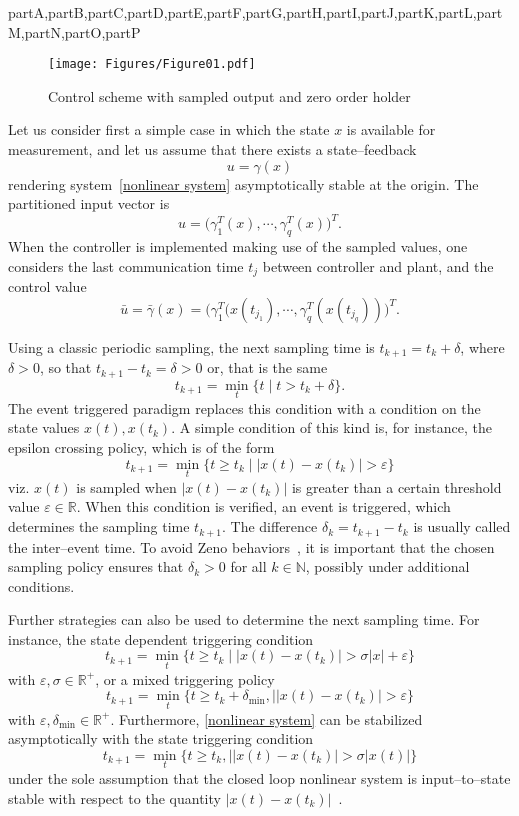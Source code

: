 \documentclass[letterpaper, 10 pt, conference]{ieeeconf}
\def\compile{partA,partB,partC,partD,partE,partF,partG,partH,partI,partJ,partK,partL,partM,partN,partO,partP}
\newcommand{\R}{\mathbb{R}}
\newcommand{\N}{\mathbb{N}}
\begin{document}
\begin{xcomment}{\compile}
\begin{partC}
\begin{figure}[h!]
\centerline{\texttt{[image: Figures/Figure01.pdf]}} 
\caption{Control scheme with sampled output and zero order holder}
\label{feedback scheme}
\end{figure}

Let us consider first a simple case in which the state $x$ is available for measurement, and let us assume that there exists a state--feedback 
\begin{equation}
u=\gamma(x)  \label{ctrlc}
\end{equation}
rendering system~\eqref{nonlinear system} asymptotically stable at the origin. The partitioned input vector is 
$$
u=\Big(\gamma_1^T(x),\cdots,\gamma_q^T(x)\Big)^T. 
$$
When the controller is implemented making use of the sampled values, one considers the last communication time $t_j$ between controller and plant, and the control value
$$
\bar u=\bar\gamma(x)=\Big(\gamma_1^T(x(t_{j_1}),\cdots,\gamma_q^T(x(t_{j_q}))\Big)^T.
$$


Using a classic periodic sampling, the next sampling time is $t_{k+1}=t_k+\delta$, where $\delta>0$, so that $t_{k+1}-t_k=\delta>0$ or, that is the same
$$
t_{k+1}=\min_t \{t\mid t>t_k+\delta\}. 
$$
The event triggered paradigm replaces this condition with a condition on the state values $x(t), x(t_k)$. A simple condition of this kind is, for instance, the epsilon crossing policy, which is of the form
$$
t_{k+1}=\min_t \{t\ge t_k\mid |x(t)-x(t_k)|>\varepsilon\}
$$
viz. $x(t)$ is sampled when $|x(t)-x(t_k)|$ is greater than a certain threshold value $\varepsilon\in\R$. When this condition is verified, an event is triggered, which determines the sampling time $t_{k+1}$. The difference $\delta_k=t_{k+1}-t_k$ is usually called the inter--event time. To avoid Zeno behaviors~\cite{Johansson 1999}, it is important that the chosen sampling policy ensures that $\delta_k>0$ for all $k\in\N$, possibly under additional conditions.

Further strategies can also be used to determine the next sampling time. For instance, the state dependent triggering condition
$$
t_{k+1}=\min_t \{t\ge t_k\mid|x(t)-x(t_k)|>\sigma|x|+\varepsilon\}
$$
with $\varepsilon,\sigma\in\R^+$, or a mixed triggering policy 
$$
t_{k+1}=\min_t \{t\ge t_k+\delta_{\min},\mid |x(t)-x(t_k)|>\varepsilon\}
$$
with $\varepsilon,\delta_{\min}\in\R^+$. Furthermore, \eqref{nonlinear system} can be stabilized asymptotically with the state triggering condition 
$$
t_{k+1}=\min_t \{t\ge t_k,\mid |x(t)-x(t_k)|>\sigma |x(t)|\}
$$ 
under the sole assumption that the closed loop nonlinear system is input--to--state stable with respect to the quantity $|x(t)-x(t_k)|$~\cite{Tabuada 2007}.



\end{partC}
\end{xcomment}
\end{document}
